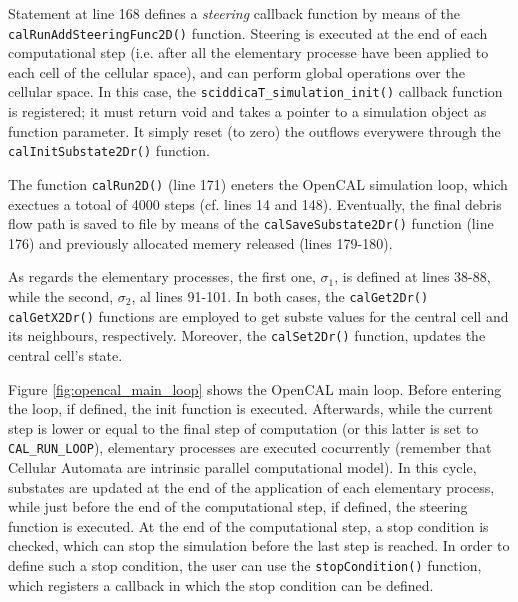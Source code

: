 Statement at line 168 defines a \emph{steering} callback function by
means of the \verb'calRunAddSteeringFunc2D()' function. Steering is
executed at the end of each computational step (i.e. after all the
elementary processe have been applied to each cell of the cellular
space), and can perform global operations over the cellular space. In
this case, the \verb'sciddicaT_simulation_init()' callback function is
registered; it must return void and takes a pointer to a simulation
object as function parameter. It simply reset (to zero) the outflows
everywere through the \verb'calInitSubstate2Dr()' function.

The function \verb'calRun2D()' (line 171) eneters the OpenCAL
simulation loop, which exectues a totoal of 4000 steps (cf. lines 14
and 148). Eventually, the final debris flow path is saved to file by
means of the \verb'calSaveSubstate2Dr()' function (line 176) and
previously allocated memery released (lines 179-180).

As regards the elementary processes, the first one, $\sigma_1$, is
defined at lines 38-88, while the second, $\sigma_2$, al lines
91-101. In both cases, the \verb'calGet2Dr()' \verb'calGetX2Dr()'
functions are employed to get subste values for the central cell and
its neighbours, respectively. Moreover, the \verb'calSet2Dr()'
function, updates the central cell's state.

Figure \ref{fig:opencal_main_loop} shows the OpenCAL main loop. Before
entering the loop, if defined, the init function is
executed. Afterwards, while the current step is lower or equal to the
final step of computation (or this latter is set to
\verb'CAL_RUN_LOOP'), elementary processes are executed cocurrently
(remember that Cellular Automata are intrinsic parallel computational
model). In this cycle, substates are updated at the end of the
application of each elementary process, while just before the end of
the computational step, if defined, the steering function is
executed. At the end of the computational step, a stop condition is
checked, which can stop the simulation before the last step is
reached. In order to define such a stop condition, the user can use
the \verb'stopCondition()' function, which registers a callback in
which the stop condition can be defined.

